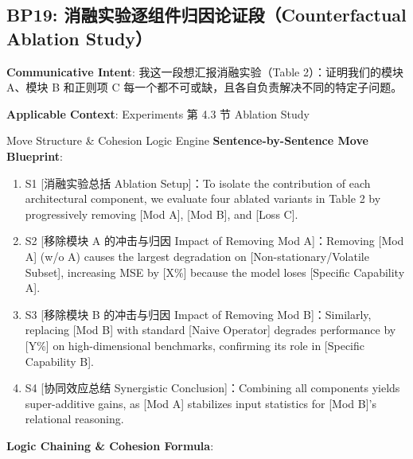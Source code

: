 \subsection{BP19: 消融实验逐组件归因论证段（Counterfactual Ablation Study）}\label{sec:bp:BP19}
\noindent\textbf{\color{AcadNavy}Communicative Intent}: 我这一段想汇报消融实验（Table 2）：证明我们的模块 A、模块 B 和正则项 C 每一个都不可或缺，且各自负责解决不同的特定子问题。\par\vspace{2pt}
\noindent\textbf{\color{AcadSlate}Applicable Context}: Experiments 第 4.3 节 Ablation Study\par\vspace{4pt}
\begin{ConceptBox}{Move Structure \& Cohesion Logic Engine}
\textbf{Sentence-by-Sentence Move Blueprint}:
\begin{enumerate}[label=\textbf{\color{AcadNavy}S\arabic*.}, leftmargin=2em, itemsep=2pt]
  \item S1 [消融实验总括 Ablation Setup]：To isolate the contribution of each architectural component, we evaluate four ablated variants in Table 2 by progressively removing [Mod A], [Mod B], and [Loss C].
  \item S2 [移除模块 A 的冲击与归因 Impact of Removing Mod A]：Removing [Mod A] (w/o A) causes the largest degradation on [Non-stationary/Volatile Subset], increasing MSE by [X\%] because the model loses [Specific Capability A].
  \item S3 [移除模块 B 的冲击与归因 Impact of Removing Mod B]：Similarly, replacing [Mod B] with standard [Naive Operator] degrades performance by [Y\%] on high-dimensional benchmarks, confirming its role in [Specific Capability B].
  \item S4 [协同效应总结 Synergistic Conclusion]：Combining all components yields super-additive gains, as [Mod A] stabilizes input statistics for [Mod B]'s relational reasoning.
\end{enumerate}\par\vspace{4pt}
\textbf{Logic Chaining \& Cohesion Formula}:\par{}
\end{ConceptBox}

